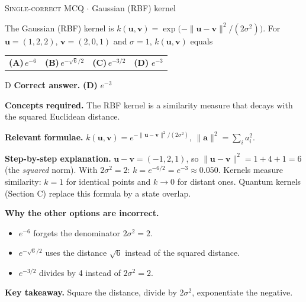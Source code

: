 \documentclass[11pt,a4paper]{article}
\newcommand{\optlabel}[1]{\textbf{(#1)}}
\newcommand{\correctlabel}[1]{\textcolor{okgreen}{\textbf{(#1)}\,\ding{51}}}
\newenvironment{qitem}[1]{\begin{list}{}{\setlength{\leftmargin}{3.3em}\setlength{\labelwidth}{3.1em}%
  \setlength{\labelsep}{0.2em}\setlength{\topsep}{3pt}\setlength{\parsep}{3pt}}\item[\textbf{Q.#1}\hfill]}{\end{list}}
\newcommand{\qsep}{\par\vspace{2pt}{\color{black!15}\hrule}\vspace{4pt}}
\newcommand{\qmeta}[2]{{\footnotesize\color{black!60}\textsc{#1} \;$\cdot$\; #2}\par}
\begin{document}
\begin{qitem}{9}
\qmeta{Single-correct MCQ}{Gaussian (RBF) kernel}
The Gaussian (RBF) kernel is $k(\mathbf u, \mathbf v) = \exp\!\big(-\|\mathbf u - \mathbf v\|^2/(2\sigma^2)\big)$. For
$\mathbf u = (1, 2, 2)$, $\mathbf v = (2, 0, 1)$ and $\sigma = 1$, $k(\mathbf u, \mathbf v)$ equals
\par\smallskip\noindent\begin{tabularx}{\linewidth}{@{}*{4}{L}@{}}
\optlabel{A}\,$e^{-6}$ & \optlabel{B}\,$e^{-\sqrt6/2}$ & \optlabel{C}\,$e^{-3/2}$ & \correctlabel{D}\,$e^{-3}$
\end{tabularx}
\end{qitem}
\begin{solbox}{D}
\textbf{\color{brand}Correct answer.} \textcolor{okgreen}{\textbf{(D)}} $e^{-3}$

\textbf{\color{brand}Concepts required.} The RBF kernel is a similarity measure that decays with the squared Euclidean distance.

\textbf{\color{brand}Relevant formulae.} $k(\mathbf u, \mathbf v) = e^{-\|\mathbf u - \mathbf v\|^2/(2\sigma^2)}$, $\|\mathbf a\|^2 = \sum_ia_i^2$.

\textbf{\color{brand}Step-by-step explanation.} $\mathbf u - \mathbf v = (-1, 2, 1)$, so $\|\mathbf u - \mathbf v\|^2 = 1 + 4 + 1 = 6$ (the \emph{squared} norm).
With $2\sigma^2 = 2$: $k = e^{-6/2} = e^{-3} \approx 0.050$. Kernels measure similarity: $k = 1$ for identical points and
$k \to 0$ for distant ones. Quantum kernels (Section C) replace this formula by a state overlap.

\textbf{\color{brand}Why the other options are incorrect.}
\begin{itemize}[leftmargin=2.4em, itemsep=1pt, topsep=2pt]
\item[\textbf{(A)}] $e^{-6}$ forgets the denominator $2\sigma^2 = 2$.
\item[\textbf{(B)}] $e^{-\sqrt6/2}$ uses the distance $\sqrt6$ instead of the squared distance.
\item[\textbf{(C)}] $e^{-3/2}$ divides by 4 instead of $2\sigma^2 = 2$.
\end{itemize}
\textbf{\color{brand}Key takeaway.} Square the distance, divide by $2\sigma^2$, exponentiate the negative.
\end{solbox}
\qsep
\end{document}
